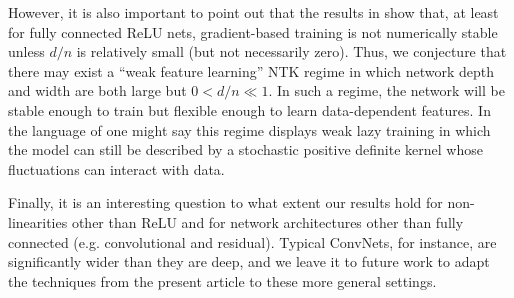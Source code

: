 \documentclass[11pt, reqno]{amsart}
\begin{document}
However, it is also important to point out that the results in \cite{hanin2018neural, hanin2018products,hanin2018start} show that, at least for fully connected ReLU nets, gradient-based training is not numerically stable unless $d/n$ is relatively small (but not necessarily zero). Thus, we conjecture that there may exist a ``weak feature learning'' NTK regime in which network depth and width are both large but $0<d/n\ll 1$. In such a regime, the network will be stable enough to train but flexible enough to learn data-dependent features. In the language of \cite{chizat2018note} one might say this regime displays weak lazy training in which the model can still be described by a stochastic positive definite kernel whose fluctuations can interact with data. 

Finally, it is an interesting question to what extent our results hold for non-linearities other than ReLU and for network architectures other than fully connected (e.g. convolutional and residual). Typical ConvNets, for instance, are significantly wider than they are deep, and we leave it to future work to adapt the techniques from the present article to these more general settings. 
\end{document}
